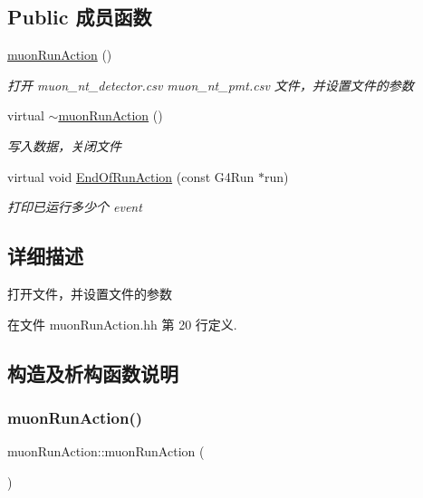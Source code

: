 \subsection*{Public 成员函数}
\begin{DoxyCompactItemize}
\item 
\hyperlink{classmuonRunAction_af8ea0396dde7e9a638382c7134173929}{muon\+Run\+Action} ()
\begin{DoxyCompactList}\small\item\em 打开 muon\+\_\+nt\+\_\+detector.\+csv muon\+\_\+nt\+\_\+pmt.\+csv 文件，并设置文件的参数 \end{DoxyCompactList}\item 
virtual \hyperlink{classmuonRunAction_a69aed79e80b3e342a75e210632468c2f}{$\sim$muon\+Run\+Action} ()
\begin{DoxyCompactList}\small\item\em 写入数据，关闭文件 \end{DoxyCompactList}\item 
virtual void \hyperlink{classmuonRunAction_aa2956c94bf9f6d3c93ac25182dd6a3ba}{End\+Of\+Run\+Action} (const G4\+Run $\ast$run)
\begin{DoxyCompactList}\small\item\em 打印已运行多少个 event \end{DoxyCompactList}\end{DoxyCompactItemize}


\subsection{详细描述}
打开文件，并设置文件的参数 

在文件 muon\+Run\+Action.\+hh 第 20 行定义.



\subsection{构造及析构函数说明}
\mbox{\label{classmuonRunAction_af8ea0396dde7e9a638382c7134173929}} 
\subsubsection{\texorpdfstring{muon\+Run\+Action()}{muonRunAction()}}
{\footnotesize\ttfamily muon\+Run\+Action\+::muon\+Run\+Action (\begin{DoxyParamCaption}{ }\end{DoxyParamCaption})}



